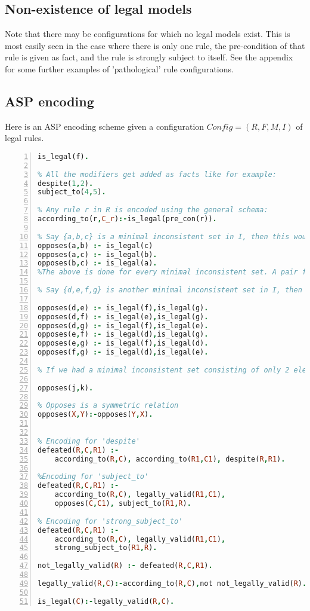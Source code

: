 \subsection{Non-existence of legal models}
Note that there may be configurations for which no legal models exist. This is most easily seen in the case where there is only one rule, the pre-condition of that rule is given as fact, and the rule is strongly subject to itself. See the appendix for some further examples of 'pathological' rule configurations.

\subsection{ASP encoding}
Here is an ASP encoding scheme given a configuration $Config = (R,F,M,I)$ of legal rules.
\begin{lstlisting}[language=Prolog, numbers=left]
% For any f in F, we have:
is_legal(f). 

% All the modifiers get added as facts like for example:
despite(1,2).
subject_to(4,5).

% Any rule r in R is encoded using the general schema:
according_to(r,C_r):-is_legal(pre_con(r)).

% Say {a,b,c} is a minimal inconsistent set in I, then this would get encoded as: 
opposes(a,b) :- is_legal(c)
opposes(a,c) :- is_legal(b).
opposes(b,c) :- is_legal(a).
%The above is done for every minimal inconsistent set. A pair from the set forms the opposes predicate and the rest of the elements go in the body 

% Say {d,e,f,g} is another minimal inconsistent set in I, then this would get encoded as:

opposes(d,e) :- is_legal(f),is_legal(g).
opposes(d,f) :- is_legal(e),is_legal(g).
opposes(d,g) :- is_legal(f),is_legal(e).
opposes(e,f) :- is_legal(d),is_legal(g).
opposes(e,g) :- is_legal(f),is_legal(d).
opposes(f,g) :- is_legal(d),is_legal(e).

% If we had a minimal inconsistent set consisting of only 2 elements say {j,k}, this would get encoded as:

opposes(j,k).

% Opposes is a symmetric relation
opposes(X,Y):-opposes(Y,X).


% Encoding for 'despite'
defeated(R,C,R1) :-
    according_to(R,C), according_to(R1,C1), despite(R,R1).

%Encoding for 'subject_to'
defeated(R,C,R1) :-
    according_to(R,C), legally_valid(R1,C1),
    opposes(C,C1), subject_to(R1,R).

% Encoding for 'strong_subject_to'
defeated(R,C,R1) :-
    according_to(R,C), legally_valid(R1,C1),
    strong_subject_to(R1,R).

not_legally_valid(R) :- defeated(R,C,R1).

legally_valid(R,C):-according_to(R,C),not not_legally_valid(R).

is_legal(C):-legally_valid(R,C).
\end{lstlisting}
